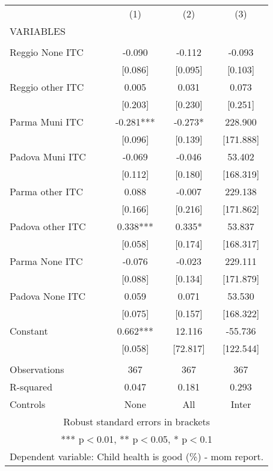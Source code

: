\begin{tabular}{lccc} \hline
 & (1) & (2) & (3) \\
VARIABLES &  &  &  \\ \hline
 &  &  &  \\
Reggio None ITC & -0.090 & -0.112 & -0.093 \\
 & [0.086] & [0.095] & [0.103] \\
Reggio other ITC & 0.005 & 0.031 & 0.073 \\
 & [0.203] & [0.230] & [0.251] \\
Parma Muni ITC & -0.281*** & -0.273* & 228.900 \\
 & [0.096] & [0.139] & [171.888] \\
Padova Muni ITC & -0.069 & -0.046 & 53.402 \\
 & [0.112] & [0.180] & [168.319] \\
Parma other ITC & 0.088 & -0.007 & 229.138 \\
 & [0.166] & [0.216] & [171.862] \\
Padova other ITC & 0.338*** & 0.335* & 53.837 \\
 & [0.058] & [0.174] & [168.317] \\
Parma None ITC & -0.076 & -0.023 & 229.111 \\
 & [0.088] & [0.134] & [171.879] \\
Padova None ITC & 0.059 & 0.071 & 53.530 \\
 & [0.075] & [0.157] & [168.322] \\
Constant & 0.662*** & 12.116 & -55.736 \\
 & [0.058] & [72.817] & [122.544] \\
 &  &  &  \\
Observations & 367 & 367 & 367 \\
R-squared & 0.047 & 0.181 & 0.293 \\
 Controls & None & All & Inter \\ \hline
\multicolumn{4}{c}{ Robust standard errors in brackets} \\
\multicolumn{4}{c}{ *** p$<$0.01, ** p$<$0.05, * p$<$0.1} \\
\multicolumn{4}{c}{ Dependent variable: Child health is good (\%) - mom report.} \\
\end{tabular}

